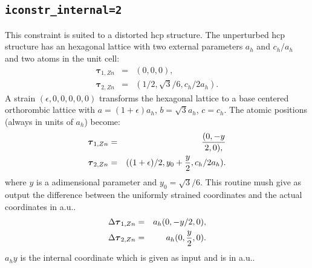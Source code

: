 \documentclass[12pt,a4paper,twoside]{report}
\begin{document}
{\color{web-blue}\subsection{\texttt{iconstr\_internal=2}}}
\color{black}
This constraint is suited to a distorted hcp structure. The unperturbed 
hcp structure has an hexagonal lattice with two external parameters
$a_h$ and $c_h/a_h$ and two atoms in the unit cell:
\begin{eqnarray}
\boldsymbol{\tau}_{1,Zn} &=& ( 0, 0, 0), \nonumber \\
\boldsymbol{\tau}_{2,Zn} &=& ( 1/2, \sqrt{3}/6, c_h/2a_h). \nonumber 
\end{eqnarray}
A strain $(\epsilon,0,0,0,0,0)$ transforms the hexagonal lattice to a 
base centered orthorombic lattice with $a=(1+\epsilon) a_h$,
$b = \sqrt{3} a_h$, $c = c_h$.
The atomic positions (always in units of $a_h$) become:
\begin{eqnarray}
\boldsymbol{\tau}_{1,Zn} &=& ( 0, -y \over 2, 0), \nonumber \\
\boldsymbol{\tau}_{2,Zn} &=& ( (1+\epsilon)/2, y_0+{y\over 2}, c_h/2 a_h). \nonumber 
\end{eqnarray}
where $y$ is a adimensional parameter and $y_0= \sqrt{3}/6$. 
This routine mush give as output the difference between the uniformly 
strained coordinates and the actual coordinates in a.u..
\begin{eqnarray}
\Delta \boldsymbol{\tau}_{1,Zn} &=& a_h ( 0, -y / 2  , 0), \nonumber \\
\Delta \boldsymbol{\tau}_{2,Zn} &=& a_h ( 0, {y\over 2}, 0). \nonumber 
\end{eqnarray}
$a_h y$ is the internal coordinate which is given as input and is in a.u..
\end{document}
